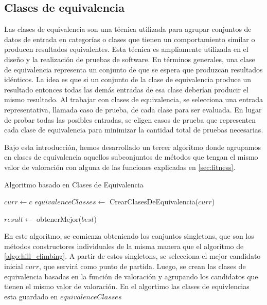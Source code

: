 \subsection{Clases de equivalencia}
\label{alg:approachCE}
 Las clases de equivalencia son una técnica utilizada para agrupar conjuntos de datos de entrada en categorías o clases que tienen un comportamiento similar o producen resultados equivalentes. Esta técnica es ampliamente utilizada en el diseño y la realización de pruebas de software.
 En términos generales, una clase de equivalencia representa  un conjunto de que se espera que produzcan resultados idénticos. La idea es que si un conjunto de la clase de equivalencia produce un resultado entonces todas las demás entradas de esa clase deberían producir el mismo resultado.
 Al trabajar con clases de equivalencia, se selecciona una entrada representativa, llamada caso de prueba, de cada clase para ser evaluada. En lugar de probar todas las posibles entradas, se eligen casos de prueba que representen cada clase de equivalencia para minimizar la cantidad total de pruebas necesarias.

 Bajo esta introducción, hemos desarrollado un tercer algoritmo donde agrupamos en clases de equivalencia aquellos subconjuntos de métodos que tengan el mismo valor de valoración con alguna de las funciones explicadas en \ref{sec:fitness}.


\begin{algorithm}[H]
  \caption{Algoritmo basado en Clases de Equivalencia}
  \label{algo:clases_equivalencia}
  \SetAlgoLined
  $curr \gets c$\; 
  $equivalenceClasses \gets$ CrearClasesDeEquivalencia($curr$)\;
  
  
  $result \gets$ obtenerMejor($best$)\;
  \;
\end{algorithm}

En este algoritmo, se comienza obteniendo los conjuntos singletons, que son los métodos constructores individuales de la misma manera que el algoritmo de \ref{algo:hill_climbing}. A partir de estos singletons, se selecciona el mejor candidato inicial $curr$, que servirá como punto de partida. Luego, se crean las clases de equivalencia basadas en la función de valoración y agrupando los candidatos que tienen el mismo valor de valoración. En el algortimo las clases de equivlencias esta guardado en $equivalenceClasses$

